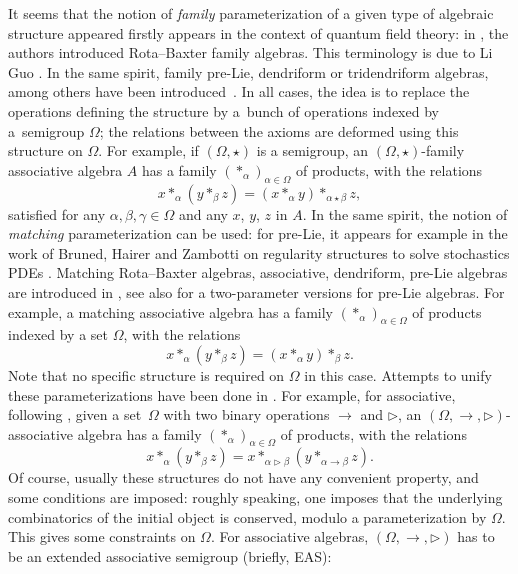 \documentclass[pdftex]{sigma}
\numberwithin{equation}{section}
\begin{document}
It seems that the notion of \emph{family} parameterization of a given type of algebraic structure appeared firstly appears in the context of quantum field theory:
in \cite{Ebrahimi-Fard2007}, the authors introduced Rota--Baxter family algebras. This terminology is due to Li Guo \cite{Guo2009}. In the same spirit, family pre-Lie, dendriform or tridendriform algebras, among others have been introduced~\cite{Foissy49,Zhang2019,Zhang2020,Zhang2020-3,Manchon2020}. In all cases, the idea is to replace the operations defining the structure by a~bunch of operations indexed by a~semigroup $\Omega$;
the relations between the axioms are deformed using this structure on $\Omega$.
For example, if $(\Omega,\star)$ is a semigroup, an $(\Omega,\star)$-family associative algebra $A$ has a family $(*_\alpha)_{\alpha \in \Omega}$ of products, with the relations
\[x*_\alpha (y *_\beta z)=( x*_\alpha y)*_{\alpha \star \beta}z,\]
satisfied for any $\alpha,\beta,\gamma \in \Omega$ and any $x$, $y$, $z$ in $A$. In the same spirit, the notion of \emph{matching} parameterization can be used: for pre-Lie, it appears for example in the work of Bruned, Hairer and Zambotti
on regularity structures to solve stochastics PDEs \cite{Bruned2019,Bruned2023,Bruned2023-1,Foissy47}.
Matching Rota--Baxter algebras, associative, dendriform, pre-Lie algebras are introduced in \cite{Foissy47,Zhang2020}, see also \cite{Foissy49} for a two-parameter versions for pre-Lie algebras.
For example, a matching associative algebra has a family $(*_\alpha)_{\alpha \in \Omega}$ of products indexed by a set $\Omega$, with the relations
\[x*_\alpha (y *_\beta z)=(x *_\alpha y)*_\beta z.\]
Note that no specific structure is required on $\Omega$ in this case.
Attempts to unify these parameterizations have been done in \cite{Foissy56,Foissy48,Foissy50}. For example, for associative, following \cite{Foissy56},
given a set~$\Omega$ with two binary operations $\rightarrow$ and $\triangleright$, an $(\Omega,\rightarrow,\triangleright)$-associative algebra has a family $(*_\alpha)_{\alpha \in \Omega}$ of products, with the relations
\[x*_\alpha (y *_\beta z)=x *_{\alpha\triangleright \beta}(y*_{\alpha \rightarrow \beta}z).\]
Of course, usually these structures do not have any convenient property, and some conditions are imposed: roughly speaking, one imposes that the underlying combinatorics of the initial object is conserved, modulo a parameterization by $\Omega$.
This gives some constraints on $\Omega$. For associative algebras, $(\Omega,\rightarrow,\triangleright)$ has to be an extended associative semigroup (briefly, EAS):
\end{document}
